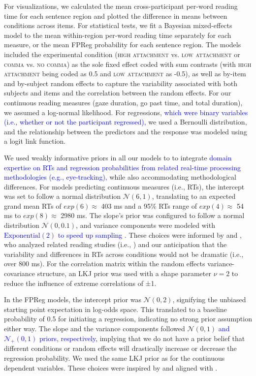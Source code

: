 \documentclass[12pt]{article}
\newcommand{\nocomma}{\textsc{no comma}\xspace}
\newcommand{\comma}{\textsc{comma}\xspace}
\newcommand{\highattach}{\textsc{high attachment}\xspace}
\newcommand{\lowattach}{\textsc{low attachment}\xspace}
\newcommand{\change}[1]{\textcolor{blue}{#1}}
\begin{document}
{For visualizations, we calculated the mean cross-participant per-word reading time for each sentence region and plotted the difference in means between conditions across items. For statistical tests, we fit a Bayesian mixed-effects model to the mean within-region per-word reading time separately for each measure, or the mean FPReg probability for each sentence region.
The models included the experimental condition (\highattach vs. \lowattach or \comma vs. \nocomma) as the sole fixed effect coded with sum contrasts (with \highattach being coded as 0.5 and \lowattach as -0.5), as well as by-item and by-subject random effects to capture the variability associated with both subjects and items and the correlation between the random effects. For our continuous reading measures (gaze duration, go past time, and total duration), we assumed a log-normal likelihood. For regressions, \change{which were binary variables (i.e., whether or not the participant regressed),} we used a Bernoulli distribution, and the relationship between the predictors and the response was modeled using a logit link function.

We used weakly informative priors in all our models to to integrate \change{domain expertise on RTs and regression probabilities from related real-time processing methodologies (e.g., eye-tracking),} while also accommodating methodological differences. For models predicting continuous measures (i.e., RTs), the intercept was set to follow a normal distribution \(\mathcal{N}(6, 1)\), translating to an expected grand mean RTs of $exp(6) \approx $ 403 ms and a 95\% RTs range of  $exp(4) \approx $ 54 ms to $exp(8) \approx $ 2980 ms. The slope's prior was configured to follow a normal distribution \(\mathcal{N}(0, 0.1)\), and variance components were modeled with \change{\(\text{{Exponential}}(2)\) to speed up sampling \citep{mcelreath2018statistical}}. These choices were informed by 
\citet{schad2021toward} and \citet{nicenboim2021introduction}, who analyzed related reading studies (i.e., \citealp{nicenboim2016high, vasishth2018statistical}) and our anticipation that the variability and differences in RTs across conditions would not be dramatic (i.e., over 800 ms). For the correlation matrix within the random effects variance-covariance structure, an LKJ prior was used with a shape parameter \(\nu = 2\) to reduce the influence of extreme correlations of ±1.

In the FPReg models, the intercept prior was \(\mathcal{N}(0, 2)\), signifying the unbiased starting point expectation in log-odds space. This translated to a baseline probability of 0.5 for initiating a regression, indicating no strong prior assumption either way. The slope and the variance components followed \(\mathcal{N}(0, 1)\) \change{and \(\mathcal{N}_+(0, 1)\) priors, respectively}, implying that we do not have a prior belief that different conditions or random effects will drastically increase or decrease the regression probability. We used the same LKJ prior as for the continuous dependent variables. These choices were inspired by and aligned with \citet{mertzen2023syntactic}.

}
\end{document}
